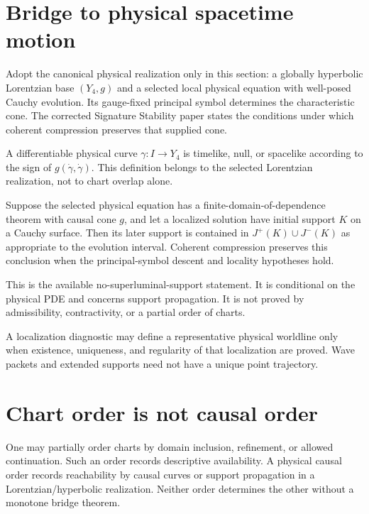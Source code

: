 \documentclass[11pt]{article}
\begin{document}
\section{Bridge to physical spacetime motion}

Adopt the canonical physical realization only in this section: a globally
hyperbolic Lorentzian base $(Y_4,g)$ and a selected local physical equation
with well-posed Cauchy evolution. Its gauge-fixed principal symbol determines
the characteristic cone. The corrected Signature Stability paper states the
conditions under which coherent compression preserves that supplied cone.

\begin{definition}
A differentiable physical curve $\gamma:I\to Y_4$ is timelike, null, or
spacelike according to the sign of $g(\dot\gamma,\dot\gamma)$. This definition
belongs to the selected Lorentzian realization, not to chart overlap alone.
\end{definition}

\begin{theorem}\label{thm:propagation}
Suppose the selected physical equation has a finite-domain-of-dependence
theorem with causal cone $g$, and let a localized solution have initial support
$K$ on a Cauchy surface. Then its later support is contained in
$J^+(K)\cup J^-(K)$ as appropriate to the evolution interval. Coherent
compression preserves this conclusion when the principal-symbol descent and
locality hypotheses hold.
\end{theorem}

This is the available no-superluminal-support statement. It is conditional on
the physical PDE and concerns support propagation. It is not proved by
admissibility, contractivity, or a partial order of charts.

A localization diagnostic may define a representative physical worldline only
when existence, uniqueness, and regularity of that localization are proved.
Wave packets and extended supports need not have a unique point trajectory.

\section{Chart order is not causal order}

One may partially order charts by domain inclusion, refinement, or allowed
continuation. Such an order records descriptive availability. A physical
causal order records reachability by causal curves or support propagation in a
Lorentzian/hyperbolic realization. Neither order determines the other without
a monotone bridge theorem.
\end{document}
